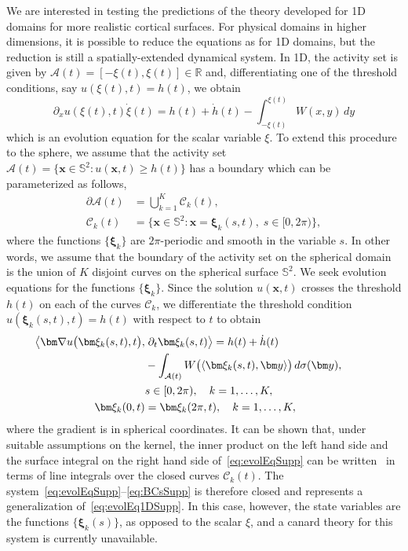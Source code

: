 \documentclass[aps,prl,reprint,superscriptaddress]{revtex4-1}
\newcommand{\RSet}{\mathbb{R}}
\newcommand{\sph}{\mathbb{S}^2}
\newcommand{\vect}[1]{\ensuremath{\bm #1}}
\newcommand{\vx}{\vect{x}}
\newcommand{\vxi}{\vect{\xi}}
\newcommand{\vy}{\vect{y}}
\newcommand{\grad}{\vect{\nabla}}
\begin{document}
We are interested in testing the predictions of the theory developed for 1D domains for
more realistic cortical surfaces. For physical domains in higher dimensions, it is
possible to reduce the equations as for 1D domains, but the reduction
is still a spatially-extended dynamical system. In 1D, the activity set
is given by $\mathcal{A}(t) = [-\xi(t), \xi(t)] \in \RSet$ and, differentiating one
of the threshold conditions, say $u(\xi(t),t) = h(t)$, we obtain
\begin{equation}\label{eq:evolEq1DSupp}
  \partial_x u(\xi(t),t) \dot \xi(t) = h(t) + \dot h(t) - \int_{-\xi(t)}^{\xi(t)}
   W(x,y)\, dy
\end{equation}
which is an evolution equation for the scalar variable $\xi$. To extend this procedure
to the sphere, we assume that the activity set 
$
\mathcal{A}(t) = \{ \vect{x} \in \sph \colon u(\vect{x},t) \geq h(t) \}
$
has a boundary which can be parameterized as follows,
\begin{align*}
  \partial \mathcal{A}(t) & = \bigcup_{k = 1}^K \mathcal{C}_k(t),\\
  \mathcal{C}_k(t) & = \{ \vect{x} \in \sph \colon \vx = \vxi_k(s,t), \; s \in [0,2\pi) \},
\end{align*}
where the functions $\{ \vxi_k \}$ are $2\pi$-periodic and smooth in the variable $s$. In other
words, we assume that the boundary of the activity set on the spherical domain is the
union of $K$ disjoint curves on the spherical surface $\sph$. We seek
evolution equations for the functions $\{ \vxi_k \}$. Since the solution $u(\vx,t)$ crosses
the threshold $h(t)$ on each of the curves $\mathcal{C}_k$, we differentiate the threshold
condition $u(\vxi_k(s,t),t) = h(t)$ with respect to $t$ to obtain
\begin{align}
\hspace*{-1cm}\label{eq:evolEqSupp}\big\langle \grad u \big(\vxi_k(s,t),t\big),& \; \partial_t \vxi_k(s,t) \big\rangle = h(t) + \dot h(t)\\
\nonumber& - \int_{\mathcal{A}(t)} W\big( \langle \vxi_k(s,t), \vy \rangle \big) \, d\sigma(\vy),\\ 
\nonumber& s \in [0,2\pi),\quad k = 1,\ldots,K,\\
\vxi_k(0,t) & = \vxi_k(2\pi,t), \quad k = 1,\ldots,K,
\label{eq:BCsSupp}
\end{align}
where the gradient is in spherical coordinates. It can be shown that, under suitable assumptions
on the kernel, the inner product on the left hand side and the surface integral on the right hand
side of~\eqref{eq:evolEqSupp} can be written~\cite{Coombes2012aa,Coombes2013aa} in terms of line
integrals over the closed curves $\mathcal{C}_k(t)$.
The system~\eqref{eq:evolEqSupp}--\eqref{eq:BCsSupp} is therefore closed and represents a generalization
of~\eqref{eq:evolEq1DSupp}. In this case, however, the state variables are the functions
$\{ \vxi_k(s) \}$, as opposed to the scalar $\xi$, and a canard theory for this system
is currently unavailable.
\end{document}
